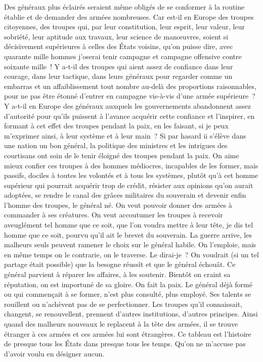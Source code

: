\documentclass[french,twoside]{book} %
\begin{document}
Des généraux plus éclairés seraient même obligés de se conformer à la routine établie et de demander des armées nombreuses. Car est-il en Europe des troupes citoyennes, des troupes qui, par leur constitution, leur esprit, leur valeur, leur sobriété, leur aptitude aux travaux, leur science de manœuvres, soient si décisivement supérieures à celles des États voisins, qu’on puisse dire, avec quarante mille hommes j’oserai tenir campagne et campagne offensive contre soixante mille ! Y a-t-il des troupes qui aient assez de confiance dans leur courage, dans leur tactique, dans leurs généraux pour regarder comme un embarras et un affaiblissement tout nombre au-delà des proportions raisonnables, pour ne pas être étonné d’entrer en campagne vis-à-vis d’une armée supérieure ? Y a-t-il en Europe des généraux auxquels les gouvernements abandonnent assez d’autorité pour qu’ils puissent à l’avance acquérir cette confiance et l’inspirer, en formant à cet effet des troupes pendant la paix, en les faisant, si je peux m’exprimer ainsi, à leur système et à leur main ? Si par hasard ii s’élève dans une nation un bon général, la politique des ministres et les intrigues des courtisans ont soin de le tenir éloigné des troupes pendant la paix. On aime mieux confier ces troupes à des hommes médiocres, incapables de les former, mais passifs, dociles à toutes les volontés et à tous les systèmes, plutôt qu’à cet homme supérieur qui pourrait acquérir trop de crédit, résister aux opinions qu’on aurait adoptées, se rendre le canal des grâces militaires du souverain et devenir enfin l’homme des troupes, le général né. On veut pouvoir donner des armées à commander à ses créatures. On veut accoutumer les troupes à recevoir aveuglément tel homme que ce soit, que l’on voudra mettre à leur tête, je dis tel homme que ce soit, pourvu qu’il ait le brevet du souverain. La guerre arrive, les malheurs seuls peuvent ramener le choix sur le général habile. On l’emploie, mais en même temps on le contrarie, on le traverse. Le dirai-je ? On voudrait (si un tel partage était possible) que la besogne réussît et que le général échouât. Ce général parvient à réparer les affaires, à les soutenir. Bientôt on craint sa réputation, on est importuné de sa gloire. On fait la paix. Le général déjà formé ou qui commençait à se former, n’est plus consulté, plus employé. Ses talents se rouillent ou n’achèvent pas de se perfectionner. Les troupes qu’il connaissait, changent, se renouvellent, prennent d’autres institutions, d’autres principes. Ainsi quand des malheurs nouveaux le replacent à la tête des armées, il se trouve étranger à ces armées et ces armées lui sont étrangères. Ce tableau est l’histoire de presque tous les États dans presque tous les temps. Qu’on ne m’accuse pas d’avoir voulu en désigner aucun.\par
\end{document}
